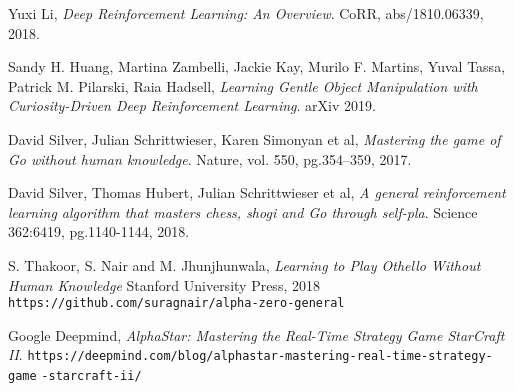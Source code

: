 \documentclass[../main.tex]{subfiles}
\begin{document}
\begin{thebibliography}{9}
        Yuxi Li, 
        \emph{Deep Reinforcement Learning: An Overview}. 
        CoRR, abs/1810.06339, 2018.
    
        Sandy H. Huang, Martina Zambelli, Jackie Kay, Murilo F. Martins, Yuval Tassa, Patrick M. Pilarski, Raia Hadsell,
        \emph{Learning Gentle Object Manipulation with Curiosity-Driven Deep Reinforcement Learning}.
        arXiv 2019.

        David Silver, Julian Schrittwieser, Karen Simonyan et al,
        \emph{Mastering the game of Go without human knowledge}.
        Nature, vol. 550, pg.354–359, 2017.
    
        David Silver, Thomas Hubert, Julian Schrittwieser et al, 
        \emph{A general reinforcement learning algorithm that
        masters chess, shogi and Go through self-pla}.
        Science 362:6419, pg.1140-1144, 2018.

        S. Thakoor, S. Nair and M. Jhunjhunwala,
        \emph{Learning to Play Othello Without Human Knowledge}
        Stanford University Press, 2018
        \texttt{https://github.com/suragnair/alpha-zero-general}

        Google Deepmind,
        \emph{AlphaStar: Mastering the Real-Time Strategy Game StarCraft II}.
        \texttt{https://deepmind.com/blog/alphastar-mastering-real-time-strategy-game} 
        \texttt{-starcraft-ii/}
        
\end{thebibliography}
\end{document}
